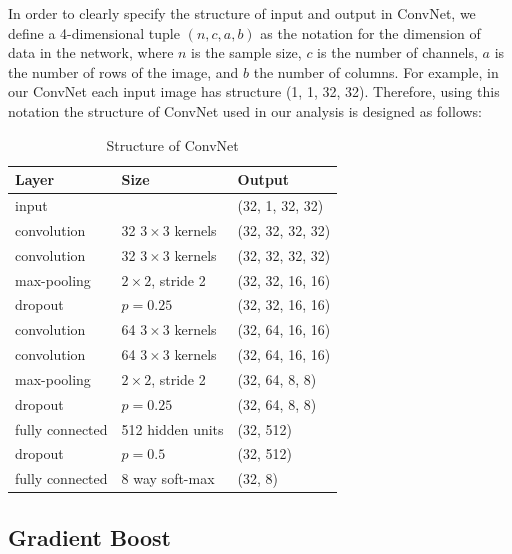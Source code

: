 \documentclass[11pt,oneside,a4paper]{article}
\numberwithin{equation}{section}
\begin{document}
In order to clearly specify the structure of input and output in ConvNet, we define a 4-dimensional tuple $(n, c, a, b)$ as the notation for the dimension of data in the network, where $n$ is the sample size, $c$ is the number of channels, $a$ is the number of rows of the image, and $b$ the number of columns. For example, in our ConvNet each input image has structure (1, 1, 32, 32). Therefore, using this notation the structure of ConvNet used in our analysis is designed as follows:

\begin{table}[ht]
\centering
\small
\caption{Structure of ConvNet}
\begin{tabular}{lll}
\toprule
Layer & Size & Output \\
\midrule
input & & (32, 1, 32, 32) \\
convolution & 32 $3\times3$ kernels & (32, 32, 32, 32) \\
convolution & 32 $3\times3$ kernels & (32, 32, 32, 32) \\
max-pooling & $2 \times 2$, stride 2 & (32, 32, 16, 16) \\
dropout & $p = 0.25$ & (32, 32, 16, 16) \\
convolution & 64 $3\times3$ kernels & (32, 64, 16, 16) \\
convolution & 64 $3\times3$ kernels & (32, 64, 16, 16) \\
max-pooling & $2 \times 2$, stride 2 & (32, 64, 8, 8) \\
dropout & $p = 0.25$ & (32, 64, 8, 8) \\
fully connected & 512 hidden units & (32, 512)\\
dropout & $p = 0.5$ & (32, 512) \\
fully connected & 8 way soft-max & (32, 8)\\
\bottomrule
\end{tabular}
\end{table}

\subsection{Gradient Boost}
\end{document}
